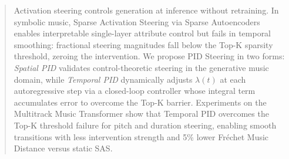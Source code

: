 \documentclass{article}
\theoremstyle{plain}
\begin{document}

\printAffiliationsAndNotice{}

\begin{abstract}
Activation steering controls generation at inference without retraining.
In symbolic music, Sparse Activation Steering via Sparse Autoencoders enables interpretable single-layer attribute control but fails in temporal smoothing: fractional steering magnitudes fall below the Top-K sparsity threshold, zeroing the intervention.
We propose PID Steering in two forms: \emph{Spatial PID} validates control-theoretic steering in the generative music domain, while \emph{Temporal PID} dynamically adjusts $\lambda(t)$ at each autoregressive step via a closed-loop controller whose integral term accumulates error to overcome the Top-K barrier.
Experiments on the Multitrack Music Transformer show that Temporal PID overcomes the Top-K threshold failure for pitch and duration steering, enabling smooth transitions with less intervention strength and 5\% lower Fr\'{e}chet Music Distance versus static SAS.

\end{abstract}
\end{document}

